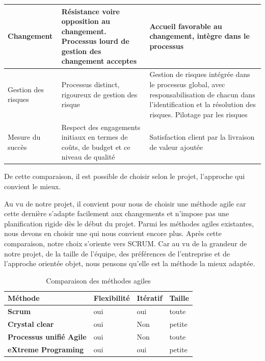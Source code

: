 \begin{table}[H]
\begin{tabular}{|l|p{5cm}|p{6cm}|}
		Changement          & Résistance voire opposition au changement. Processus lourd de gestion des changement acceptes          & Accueil favorable au changement, intègre dans le processus                                                                                                           \\ \hline
		Gestion des risques & Processus distinct, rigoureux de gestion des risque                                                    & Gestion de risques intégrée dans le processus global, avec responsabilisation de chacun dans l’identification et la résolution des risques. Pilotage par les risques \\ \hline
		Mesure du succès    & Respect des engagements initiaux en termes de coûts, de budget et ce niveau de qualité                 & Satisfaction client par la livraison de valeur ajoutée                                                                                                               \\ \hline
	\end{tabular}
\end{table}

De cette comparaison, il est possible de choisir selon le projet, l’approche qui convient le
mieux.

Au vu de notre projet, il convient pour nous de choisir une méthode agile car cette dernière
s’adapte facilement aux changements et n’impose pas une planification rigide dès le début du
projet. Parmi les méthodes agiles existantes, nous devons en choisir une qui nous convient
encore plus. Après cette comparaison, notre choix s’oriente vers SCRUM.
Car au vu de la grandeur de notre projet, de la taille de l’équipe, des préférences de l’entreprise et de l’approche orientée objet, nous pensons qu’elle est la méthode la mieux adaptée.

\begin{table}[H]
	\centering
	\caption{Comparaison des méthodes agiles}
	\label{tab:my-table}
	\begin{tabular}{|l|l|l|l|}
		\hline
		\textbf{Méthode}                & \textbf{Flexibilité} & \textbf{Itératif} & \textbf{Taille} \\ \hline
		\textbf{Scrum}                  & oui                  & oui               & toute           \\ \hline
		\textbf{Crystal clear}          & oui                  & Non               & petite          \\ \hline
		\textbf{Processus unifié Agile} & oui                  & Non               & toute           \\ \hline
		\textbf{eXtreme Programing}     & oui                  & oui               & petite          \\ \hline
	\end{tabular}
\end{table}

